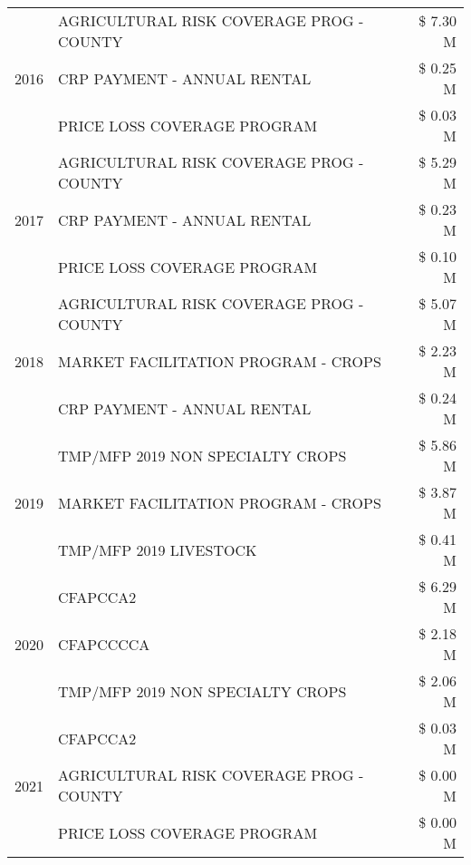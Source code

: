 \begin{tabular}{llr}
\cline{1-3}
\multirow[t]{3}{*}{2016} & AGRICULTURAL RISK COVERAGE PROG - COUNTY & \$ 7.30 M \\
 & CRP PAYMENT - ANNUAL RENTAL & \$ 0.25 M \\
 & PRICE LOSS COVERAGE PROGRAM & \$ 0.03 M \\
\cline{1-3}
\multirow[t]{3}{*}{2017} & AGRICULTURAL RISK COVERAGE PROG - COUNTY & \$ 5.29 M \\
 & CRP PAYMENT - ANNUAL RENTAL & \$ 0.23 M \\
 & PRICE LOSS COVERAGE PROGRAM & \$ 0.10 M \\
\cline{1-3}
\multirow[t]{3}{*}{2018} & AGRICULTURAL RISK COVERAGE PROG - COUNTY & \$ 5.07 M \\
 & MARKET FACILITATION PROGRAM - CROPS & \$ 2.23 M \\
 & CRP PAYMENT - ANNUAL RENTAL & \$ 0.24 M \\
\cline{1-3}
\multirow[t]{3}{*}{2019} & TMP/MFP 2019 NON SPECIALTY CROPS & \$ 5.86 M \\
 & MARKET FACILITATION PROGRAM - CROPS & \$ 3.87 M \\
 & TMP/MFP 2019 LIVESTOCK & \$ 0.41 M \\
\cline{1-3}
\multirow[t]{3}{*}{2020} & CFAPCCA2 & \$ 6.29 M \\
 & CFAPCCCCA & \$ 2.18 M \\
 & TMP/MFP 2019 NON SPECIALTY CROPS & \$ 2.06 M \\
\cline{1-3}
\multirow[t]{3}{*}{2021} & CFAPCCA2 & \$ 0.03 M \\
 & AGRICULTURAL RISK COVERAGE PROG - COUNTY & \$ 0.00 M \\
 & PRICE LOSS COVERAGE PROGRAM & \$ 0.00 M \\
\cline{1-3}
\bottomrule
\end{tabular}
